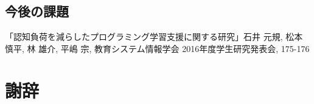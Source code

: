 \documentclass[11pt, a4paper]{jreport}
\begin{document}
\section{今後の課題}
\renewcommand{\bibname}{参考文献}
\begin{thebibliography}{10}
「認知負荷を減らしたプログラミング学習支援に関する研究」石井 元規, 松本 慎平, 林 雄介, 平嶋 宗, 教育システム情報学会 2016年度学生研究発表会, 175-176
\end{thebibliography}

\chapter*{謝辞}
\end{document}
